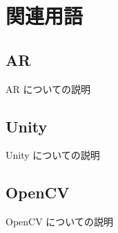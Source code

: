 \section{関連用語}

\subsection{AR}
AR についての説明

\subsection{Unity}
Unity についての説明

\subsection{OpenCV}
OpenCV についての説明